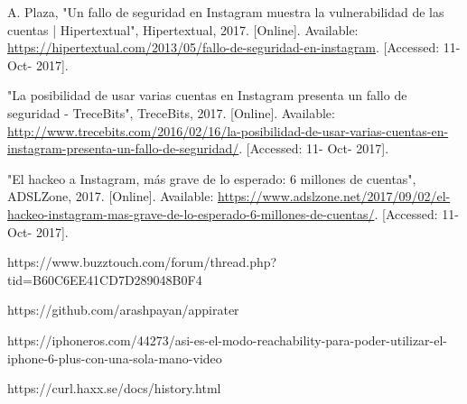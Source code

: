 \documentclass[a4paper,11pt]{article}
\theoremstyle{mytheor}
\begin{document}
\begin{thebibliography}{1}
A. Plaza, "Un fallo de seguridad en Instagram muestra la vulnerabilidad de las cuentas | Hipertextual", Hipertextual, 2017. [Online]. Available: \url{https://hipertextual.com/2013/05/fallo-de-seguridad-en-instagram}. [Accessed: 11- Oct- 2017].


"La posibilidad de usar varias cuentas en Instagram presenta un fallo de seguridad - TreceBits", TreceBits, 2017. [Online]. Available: \url{http://www.trecebits.com/2016/02/16/la-posibilidad-de-usar-varias-cuentas-en-instagram-presenta-un-fallo-de-seguridad/}. [Accessed: 11- Oct- 2017].

"El hackeo a Instagram, más grave de lo esperado: 6 millones de cuentas", ADSLZone, 2017. [Online]. Available: \url{https://www.adslzone.net/2017/09/02/el-hackeo-instagram-mas-grave-de-lo-esperado-6-millones-de-cuentas/}. [Accessed: 11- Oct- 2017].

https://www.buzztouch.com/forum/thread.php?tid=B60C6EE41CD7D289048B0F4

https://github.com/arashpayan/appirater

https://iphoneros.com/44273/asi-es-el-modo-reachability-para-poder-utilizar-el-iphone-6-plus-con-una-sola-mano-video

https://curl.haxx.se/docs/history.html

\end{thebibliography}

\newpage
\end{document}
